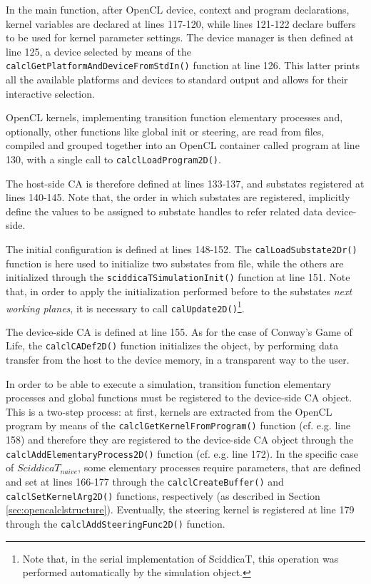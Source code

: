 In the main function, after OpenCL device, context and program
declarations, kernel variables are declared at lines 117-120, while
lines 121-122 declare buffers to be used for kernel parameter
settings.  The device manager is then defined at line 125, a device
selected by means of the \verb'calclGetPlatformAndDeviceFromStdIn()'
function at line 126. This latter prints all the available platforms
and devices to standard output and allows for their interactive
selection.

OpenCL kernels, implementing transition function elementary
processes and, optionally, other functions like global init or
steering, are read from files, compiled and grouped together into an
OpenCL container called program at line 130, with a single call to
\verb'calclLoadProgram2D()'.

The host-side CA is therefore defined at lines 133-137, and
substates registered at lines 140-145. Note that, the order in which
substates are registered, implicitly define the values to be assigned
to substate handles to refer related data device-side.

The initial configuration is defined at lines 148-152. The
\verb'calLoadSubstate2Dr()' function is here used to initialize two
substates from file, while the others are initialized through the
\verb'sciddicaTSimulationInit()' function at line 151. Note that, in
order to apply the initialization performed before to the substates
\emph{next working planes}, it is necessary to call
\verb'calUpdate2D()'\footnote{Note that, in the serial implementation
  of SciddicaT, this operation was performed automatically by the
  simulation object.}.

The device-side CA is defined at line 155. As for the case of Conway's
Game of Life, the \verb'calclCADef2D()' function initializes the
object, by performing data transfer from the host to the device memory,
in a transparent way to the user.

In order to be able to execute a simulation, transition function
elementary processes and global functions must be registered to the
device-side CA object. This is a two-step process: at first, kernels
are extracted from the OpenCL program by means of the
\verb'calclGetKernelFromProgram()' function (cf. e.g. line 158) and
therefore they are registered to the device-side CA object through the
\verb'calclAddElementaryProcess2D()' function (cf. e.g. line 172). In
the specific case of $SciddicaT_{naive}$, some elementary processes require
parameters, that are defined and set at lines 166-177 through the
\verb'calclCreateBuffer()' and \verb'calclSetKernelArg2D()' functions,
respectively (as described in Section
\ref{sec:opencalclstructure}). Eventually, the steering kernel is
registered at line 179 through the \verb'calclAddSteeringFunc2D()'
function.

